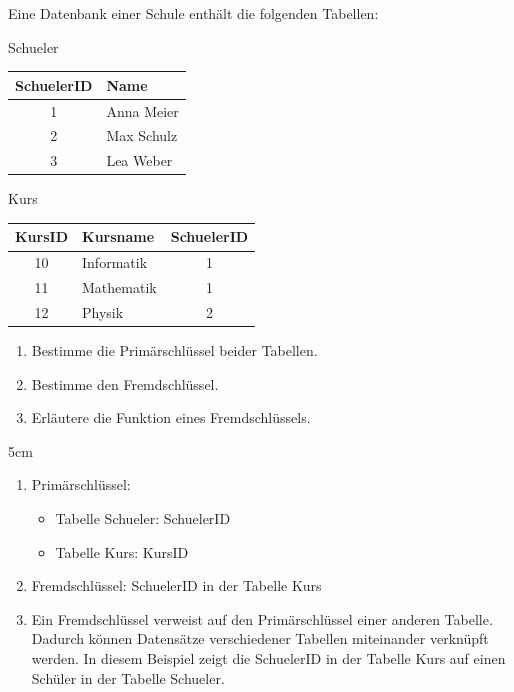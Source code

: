 \question[4]
Eine Datenbank einer Schule enthält die folgenden Tabellen:



\begin{center}
\begin{minipage}[t]{0.45\textwidth}


Schueler \\

\begin{tabular}{|c|l|}
\hline
SchuelerID & Name \\
\hline
1 & Anna Meier \\
2 & Max Schulz \\
3 & Lea Weber \\
\hline
\end{tabular}
\end{minipage}
\hfill
\begin{minipage}[t]{0.45\textwidth}


Kurs \\

\begin{tabular}{|c|l|c|}
\hline
KursID & Kursname & SchuelerID \\
\hline
10 & Informatik & 1 \\
11 & Mathematik & 1 \\
12 & Physik & 2 \\
\hline
\end{tabular}
\end{minipage}
\end{center}

\begin{enumerate}[label=\alph*)]
\item Bestimme die Primärschlüssel beider Tabellen.
\item Bestimme den Fremdschlüssel.
\item Erläutere die Funktion eines Fremdschlüssels.
\end{enumerate}

\begin{solutionbox}{5cm}
\begin{enumerate}
\item Primärschlüssel:
    \begin{itemize}
    \item Tabelle Schueler: SchuelerID
    \item Tabelle Kurs: KursID
    \end{itemize}

\item Fremdschlüssel:     
    SchuelerID in der Tabelle Kurs

\item Ein Fremdschlüssel verweist auf den Primärschlüssel einer anderen Tabelle.    
    Dadurch können Datensätze verschiedener Tabellen miteinander verknüpft werden.    
    In diesem Beispiel zeigt die SchuelerID in der Tabelle Kurs auf einen Schüler in der Tabelle Schueler.
\end{enumerate}
\end{solutionbox}